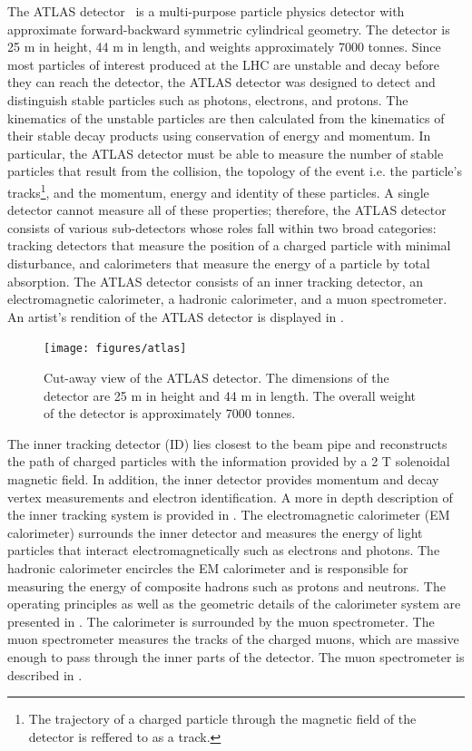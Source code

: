 The ATLAS detector~\cite{Aad:2008zzm} is a multi-purpose particle physics detector
with approximate forward-backward symmetric cylindrical geometry. The detector
is 25 m in height, 44 m in length, and weights approximately 7000 tonnes. 
Since most particles of interest produced at the LHC are unstable
and decay before they can reach the detector, the ATLAS detector
was designed to detect and distinguish stable particles such as photons,
electrons, and protons. 
The kinematics of the unstable particles
are then calculated from the kinematics of their stable decay products
using conservation of energy and momentum.  In particular, the ATLAS
detector must be able to measure the
number of stable particles that result from the collision, the topology
of the event i.e. the particle's tracks\footnote{The trajectory of a charged
particle through the magnetic field of the detector is reffered to as a track.}, and 
the momentum, energy and identity of these particles.
A single detector cannot measure
all of these properties; therefore, the ATLAS detector consists of various
sub-detectors whose roles fall within two broad categories:
tracking detectors that measure the position of a charged particle with
minimal disturbance, and calorimeters that measure the energy of a particle
by total absorption. The ATLAS detector consists of
an inner tracking detector, an electromagnetic calorimeter, a hadronic calorimeter,
and a muon spectrometer. An artist's rendition of the ATLAS detector is 
displayed in .
 
\begin{figure}[!hbpt]
  \centering
  \texttt{[image: figures/atlas]}
  \caption{Cut-away view of the ATLAS detector. The dimensions of the detector
  are 25 m in height and 44 m in length. The overall weight of the detector
  is approximately 7000 tonnes.}
  \label{fig:atlas}
\end{figure}

The inner tracking detector (ID) lies closest to the beam pipe and reconstructs
the path of charged particles with the information provided by a 2 T solenoidal
magnetic field. In addition, the inner detector provides momentum
and decay vertex measurements and electron identification. A more in depth
description of the inner tracking system is provided in .
The electromagnetic calorimeter (EM calorimeter) surrounds the inner detector
and measures the energy of light particles that interact electromagnetically such 
as electrons and photons. The hadronic calorimeter encircles the EM calorimeter
and is responsible for measuring the energy of composite hadrons such as protons
and neutrons. The operating principles as well as the geometric details of
the calorimeter system are presented in . The calorimeter
is surrounded by the muon spectrometer. The muon spectrometer measures the tracks
of the charged muons, which are massive enough to pass through the inner parts
of the detector. The muon spectrometer is described in .

